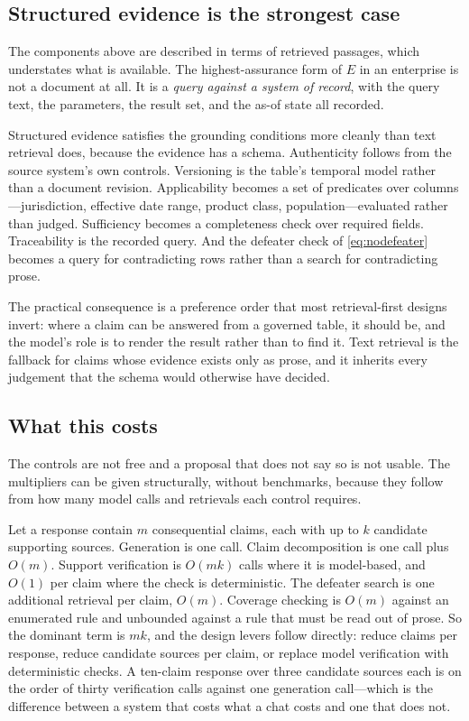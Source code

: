 \documentclass[11pt]{article}
\theoremstyle{plain}
\theoremstyle{definition}
\begin{document}
\subsection{Structured evidence is the strongest case}
\label{sec:structured}

The components above are described in terms of retrieved passages, which
understates what is available. The highest-assurance form of $E$ in an enterprise is
not a document at all. It is a \emph{query against a system of record}, with the query
text, the parameters, the result set, and the as-of state all recorded.

Structured evidence satisfies the grounding conditions more cleanly than text
retrieval does, because the evidence has a schema. Authenticity follows from the source
system's own controls. Versioning is the table's temporal model rather than a document
revision. Applicability becomes a set of predicates over columns---jurisdiction,
effective date range, product class, population---evaluated rather than judged.
Sufficiency becomes a completeness check over required fields. Traceability is the
recorded query. And the defeater check of \eqref{eq:nodefeater} becomes a query for
contradicting rows rather than a search for contradicting prose.

The practical consequence is a preference order that most retrieval-first designs
invert: where a claim can be answered from a governed table, it should be, and the
model's role is to render the result rather than to find it. Text retrieval is the
fallback for claims whose evidence exists only as prose, and it inherits every
judgement that the schema would otherwise have decided.

\subsection{What this costs}
\label{sec:cost}

The controls are not free and a proposal that does not say so is not usable. The
multipliers can be given structurally, without benchmarks, because they follow from how
many model calls and retrievals each control requires.

Let a response contain $m$ consequential claims, each with up to $k$ candidate
supporting sources. Generation is one call. Claim decomposition is one call plus $O(m)$.
Support verification is $O(mk)$ calls where it is model-based, and $O(1)$ per claim where
the check is deterministic. The defeater search is one additional retrieval per claim,
$O(m)$. Coverage checking is $O(m)$ against an enumerated rule and unbounded against a
rule that must be read out of prose. So the dominant term is $mk$, and the design levers
follow directly: reduce claims per response, reduce candidate sources per claim, or
replace model verification with deterministic checks. A ten-claim response over three
candidate sources each is on the order of thirty verification calls against one
generation call---which is the difference between a system that costs what a chat costs
and one that does not.
\end{document}
